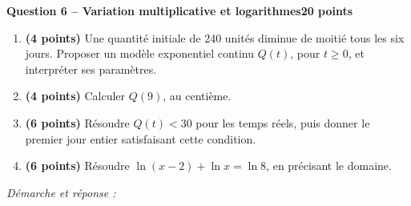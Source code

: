 \documentclass[11pt,a4paper]{article}
\begin{document}
\newpage
{\large\bfseries Question 6 -- Variation multiplicative et logarithmes}\hfill\textbf{20 points}\par
\begin{enumerate}
\item \textbf{(4 points)} Une quantité initiale de 240 unités diminue de moitié tous les six jours. Proposer un modèle exponentiel continu \(Q(t)\), pour \(t\ge0\), et interpréter ses paramètres.
\item \textbf{(4 points)} Calculer \(Q(9)\), au centième.
\item \textbf{(6 points)} Résoudre \(Q(t)<30\) pour les temps réels, puis donner le premier jour entier satisfaisant cette condition.
\item \textbf{(6 points)} Résoudre \(\ln(x-2)+\ln x=\ln8\), en précisant le domaine.
\end{enumerate}
\vspace{3mm}\textit{Démarche et réponse :}\par\vfill
\end{document}
